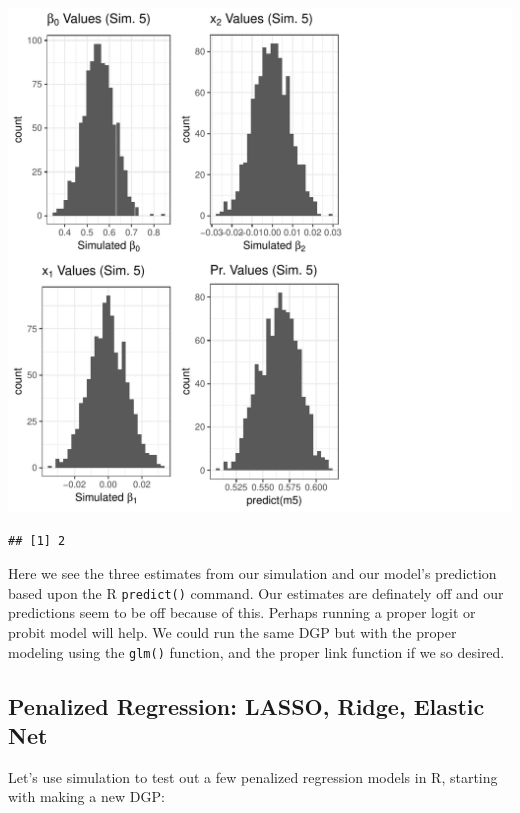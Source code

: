 \documentclass[12pt]{article}\usepackage[]{graphicx}\usepackage[]{color}
\makeatletter
\def\maxwidth{ %
  \ifdim\Gin@nat@width>\linewidth
    \linewidth
  \else
    \Gin@nat@width
  \fi
}
\newenvironment{kframe}{%
 \def\at@end@of@kframe{}%
 \ifinner\ifhmode%
  \def\at@end@of@kframe{\end{minipage}}%
  \begin{minipage}{\columnwidth}%
 \fi\fi%
 \def\FrameCommand##1{\hskip\@totalleftmargin \hskip-\fboxsep
 \colorbox{shadecolor}{##1}\hskip-\fboxsep
     \hskip-\linewidth \hskip-\@totalleftmargin \hskip\columnwidth}%
 \MakeFramed {\advance\hsize-\width
   \@totalleftmargin\z@ \linewidth\hsize
   \@setminipage}}%
 {\par\unskip\endMakeFramed%
 \at@end@of@kframe}
\newenvironment{knitrout}{}{} %
\makeatother
\begin{document}
\begin{flushleft}
\begin{center}
\begin{knitrout}
\color{fgcolor}
\includegraphics[width=\maxwidth]{figure/hiddenplotlineartologit-1} 
\begin{kframe}\begin{verbatim}
## [1] 2
\end{verbatim}
\end{kframe}
\end{knitrout}
\end{center}

Here we see the three estimates from our simulation and our model's prediction based upon the R \texttt{predict()} command. Our estimates are definately off and our predictions seem to be off because of this. Perhaps running a proper logit or probit model will help. We could run the same DGP but with the proper modeling using the \texttt{glm()} function, and the proper link function if we so desired.


\subsection{Penalized Regression: LASSO, Ridge, Elastic Net}

Let's use simulation to test out a few penalized regression models in R, starting with making a new DGP:


\end{flushleft}
\end{document}

